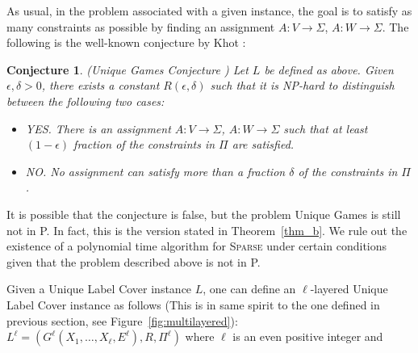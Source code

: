 \documentclass[11pt]{article}
\newtheorem{con}[thm]{Conjecture}
\begin{document}
As usual, in the problem associated with a given instance,
the goal is to satisfy as many constraints as possible by
finding an assignment $A\colon V \rightarrow \Sigma$,
$A\colon W \rightarrow \Sigma$. The following is the well-known
conjecture by Khot \cite{Khot-UGC}:

\begin{con} (Unique Games Conjecture \cite{Khot-UGC})
Let $L$ be defined as above. Given $\epsilon,\delta>0$,
there exists a constant $R(\epsilon,\delta)$ such that it is \textsf{NP}-hard
to distinguish between the following two cases:

\begin{itemize}
\item YES. There is an assignment $A\colon V \rightarrow \Sigma$,
$A\colon W \rightarrow \Sigma$ such that at least $(1-\epsilon)$
fraction of the constraints in $\Pi$ are satisfied.

\item NO. No assignment can satisfy more than a fraction
$\delta$ of the constraints in $\Pi$.
\end{itemize}
\end{con}

It is possible that the conjecture is false, but the problem
Unique Games is still not in \textsf{P}. In fact, this is the version
stated in Theorem~\ref{thm_b}. We rule out the existence of
a polynomial time algorithm for \textsc{Sparse} under certain
conditions given that the problem described above is not in \textsf{P}.

Given a Unique Label Cover instance $L$, one can define an
$\ell$-layered Unique Label Cover instance as follows (This
is in same spirit to the one defined in previous section, see
Figure~\ref{fig:multilayered}): $L^{\ell} = (G^{\ell}(X_1,
\hdots, X_{\ell},E^{\ell}), R, \Pi^{\ell})$ where $\ell$ is
an even positive integer and
\end{document}
